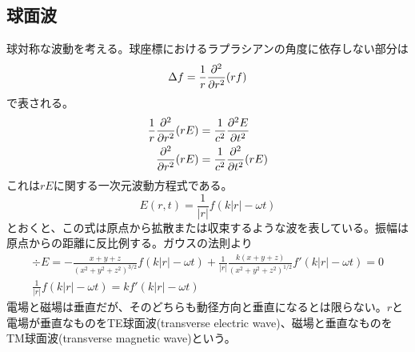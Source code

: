\subsection{球面波}
    球対称な波動を考える。球座標におけるラプラシアンの角度に依存しない部分は
        \[\Delta f = \frac{1}{r}\pdv[2]{r}(rf)\]
    で表される。
    \begin{align*}
        \frac{1}{r}\pdv[2]{r}(rE) &= \frac{1}{c^2}\pdv[2]{E}{t}\\
        \pdv[2]{r}(rE) &= \frac{1}{c^2}\pdv[2]{t}(rE)
    \end{align*}
    これは$rE$に関する一次元波動方程式である。
        \[E(r, t) = \frac{1}{|r|}{f(k|r| - \omega t)}\]
    とおくと、この式は原点から拡散または収束するような波を表している。振幅は原点からの距離に反比例する。ガウスの法則より
    \begin{gather*}
        \div E = -\frac{x + y + z}{(x^2 + y^2 + z^2)^{3/2}}f(k|r| - \omega t) + \frac{1}{|r|}\frac{k(x + y + z)}{(x^2 + y^2 + z^2)^{1/2}}f'(k|r| - \omega t) = 0\\
        \frac{1}{|r|}f(k|r| - \omega t) = kf'(k|r| - \omega t)
    \end{gather*}
    電場と磁場は垂直だが、そのどちらも動径方向と垂直になるとは限らない。$r$と電場が垂直なものをTE球面波(transverse electric wave)、磁場と垂直なものをTM球面波(transverse magnetic wave)という。

